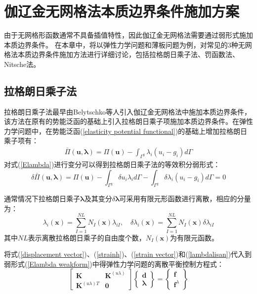 \chapter{伽辽金无网格法本质边界条件施加方案}
由于无网格形函数通常不具备插值特性，因此伽辽金无网格法需要通过弱形式施加本质边界条件。
在本章中，将以弹性力学问题和薄板问题为例，对常见的3种无网格法本质边界条件施加方法进行详细讨论，包括拉格朗日乘子法、罚函数法、Nitsche法。
\section{拉格朗日乘子法}
拉格朗日乘子法最早由Belytschko等人\cite{belytschko1994}引入伽辽金无网格法中施加本质边界条件，该方法在原有的势能泛函的基础上引入拉格朗日乘子项施加本质边界条件。在弹性力学问题中，在势能泛函(\ref{elasticity potential functional})的基础上增加拉格朗日乘子项有：
\begin{equation}\label{Elambda}
\begin{split}
    \bar{\Pi}(\pmb{u},\pmb \lambda)=\Pi(\pmb{u})-\int_{\Gamma^g}\lambda_i(u_i-g_i)d\Gamma
\end{split}
\end{equation}   
对式(\ref{Elambda})进行变分可以得到拉格朗日乘子法的等效积分弱形式：
\begin{equation}\label{Elambda weakform}
        \delta\bar{\Pi}(\pmb{u},\pmb{\lambda})=\Pi(\pmb{u})-\int_{\Gamma^g}\delta u_i\lambda_id\Gamma-\int_{\Gamma^g}\delta\lambda_i(u_i-g_i)d\Gamma=0
\end{equation}\par
通常情况下拉格朗日乘子$\pmb{\lambda}$及其变分$\delta\pmb{\lambda}$可采用有限元形函数进行离散，相应的分量为：
\begin{equation}\label{lambdalisan}
\lambda_i(\pmb{x})=\sum_{I=1}^{N\!L}N_I(\pmb{x})\lambda_{iI},\quad
\delta\lambda_i(\pmb{x})=\sum_{I=1}^{N\!L}N_I(\pmb{x})\delta\lambda_{iI}
\end{equation}
其中$N\!L$表示离散拉格朗日乘子的自由度个数，$N_I(\pmb{x})$为有限元函数。\par
将式(\ref{displacement vector})、(\ref{strainh})、(\ref{strain vector})和(\ref{lambdalisan})代入到弱形式(\ref{Elambda weakform})中得弹性力学问题的离散平衡控制方程式：
\begin{equation}
    \begin{bmatrix}\pmb{K}&\pmb{K}^{(u\lambda)}\\\pmb{K}^{(u\lambda) T}&\pmb{0}\end{bmatrix}
    \left\{\begin{matrix}\pmb{d}\\\pmb{\lambda}\end{matrix}\right\}=
    \left\{\begin{matrix}\pmb{f}\\\pmb{f}^{\lambda}\end{matrix}\right\}
\end{equation}
